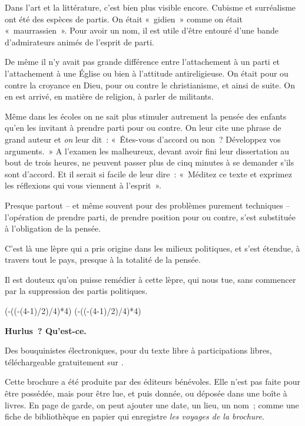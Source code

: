 \documentclass[french,twoside]{book} %
\def\truncdiv#1#2{((#1-(#2-1)/2)/#2)}
\def\moduloop#1#2{(#1-\truncdiv{#1}{#2}*#2)}
\def\modulo#1#2{\number\numexpr\moduloop{#1}{#2}\relax}
\begin{document}
Dans l’art et la littérature, c’est bien plus visible encore. Cubisme et surréalisme ont été des espèces de partis. On était « gidien » comme on était « maurrassien ». Pour avoir un nom, il est utile d’être entouré d’une bande d’admirateurs animés de l’esprit de parti.\par
De même il n’y avait pas grande différence entre l’attachement à un parti et l’attachement à une Église ou bien à l’attitude antireligieuse. On était pour ou contre la croyance en Dieu, pour ou contre le christianisme, et ainsi de suite. On en est arrivé, en matière de religion, à parler de militants.\par
Même dans les écoles on ne sait plus stimuler autrement la pensée des enfants qu’en les invitant à prendre parti pour ou contre. On leur cite une phrase de grand auteur et \emph{on} leur dit : « Êtes-vous d’accord ou non ? Développez vos arguments. » A l’examen les malheureux, devant avoir fini leur dissertation au bout de trois heures, ne peuvent passer plus de cinq minutes à se demander s’ils sont d’accord. Et il serait si facile de leur dire : « Méditez ce texte et exprimez les réflexions qui vous viennent à l’esprit ».\par
Presque partout – et même souvent pour des problèmes purement techniques – l’opération de prendre parti, de prendre position pour ou contre, s’est substituée à l’obligation de la pensée.\par
C’est là une lèpre qui a pris origine dans les milieux politiques, et s’est étendue, à travers tout le pays, presque à la totalité de la pensée.\par
Il est douteux qu’on puisse remédier à cette lèpre, qui nous tue, sans commencer par la suppression des partis politiques.
 


\ifbooklet
  \pagestyle{empty}
  \clearpage
  \ifnum\modulo{\value{page}}{4}=0 \hbox{}\newpage\hbox{}\newpage\fi
  \ifnum\modulo{\value{page}}{4}=1 \hbox{}\newpage\hbox{}\newpage\fi


  \hbox{}\newpage
  \ifodd\value{page}\hbox{}\newpage\fi
  {\centering\color{rubric}\bfseries\noindent\large
    Hurlus ? Qu’est-ce.\par
    \bigskip
  }
  \noindent Des bouquinistes électroniques, pour du texte libre à participations libres,
  téléchargeable gratuitement sur \href{https://hurlus.fr}{}.\par
  \bigskip
  \noindent Cette brochure a été produite par des éditeurs bénévoles.
  Elle n’est pas faite pour être possédée, mais pour être lue, et puis donnée, ou déposée dans une boîte à livres.
  En page de garde, on peut ajouter une date, un lieu, un nom ;
  comme une fiche de bibliothèque en papier qui enregistre \emph{les voyages de la brochure}.
  \par
\end{document}
